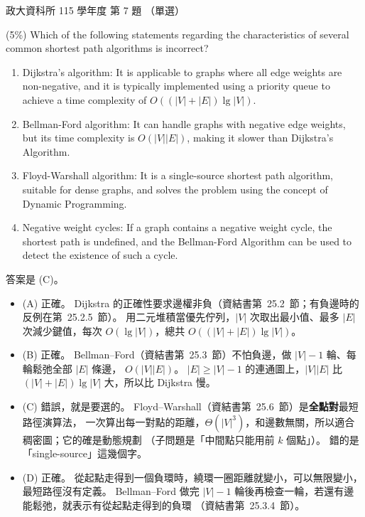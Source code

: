 \begin{pastexam}[label={px:nccu-115-dsa-07}]{政大資科所 115 學年度 第 7 題}
（單選）

(5\%) Which of the following statements regarding the characteristics of several common shortest path
algorithms is incorrect?
\begin{enumerate}[label=(\Alph*)]
\item Dijkstra's algorithm: It is applicable to graphs where all edge weights are non-negative, and it is
typically implemented using a priority queue to achieve a time complexity of $O((|V|+|E|)\lg|V|)$.
\item Bellman-Ford algorithm: It can handle graphs with negative edge weights, but its time complexity is
$O(|V||E|)$, making it slower than Dijkstra's Algorithm.
\item Floyd-Warshall algorithm: It is a single-source shortest path algorithm, suitable for dense graphs,
and solves the problem using the concept of Dynamic Programming.
\item Negative weight cycles: If a graph contains a negative weight cycle, the shortest path is undefined,
and the Bellman-Ford Algorithm can be used to detect the existence of such a cycle.
\end{enumerate}
\end{pastexam}

\begin{pastsoln}
答案是 (C)。

\begin{itemize}
\item (A) 正確。 Dijkstra 的正確性要求邊權非負（資結書第~25.2~節；有負邊時的反例在第~25.2.5~節）。
用二元堆積當優先佇列，$|V|$ 次取出最小值、最多 $|E|$ 次減少鍵值，每次 $O(\lg|V|)$，總共
$O((|V| + |E|)\lg|V|)$。
\item (B) 正確。 Bellman--Ford（資結書第~25.3~節）不怕負邊，做 $|V| - 1$ 輪、每輪鬆弛全部 $|E|$ 條邊，
$O(|V||E|)$。 $|E| \ge |V| - 1$ 的連通圖上，$|V||E|$ 比 $(|V| + |E|)\lg|V|$ 大，所以比 Dijkstra 慢。
\item (C) 錯誤，就是要選的。 Floyd--Warshall（資結書第~25.6~節）是\textbf{全點對}最短路徑演算法，
一次算出每一對點的距離，$\Theta(|V|^3)$，和邊數無關，所以適合稠密圖；它的確是動態規劃
（子問題是「中間點只能用前 $k$ 個點」）。 錯的是「single-source」這幾個字。
\item (D) 正確。 從起點走得到一個負環時，繞環一圈距離就變小，可以無限變小，最短路徑沒有定義。
Bellman--Ford 做完 $|V| - 1$ 輪後再檢查一輪，若還有邊能鬆弛，就表示有從起點走得到的負環
（資結書第~25.3.4~節）。
\end{itemize}
\end{pastsoln}
